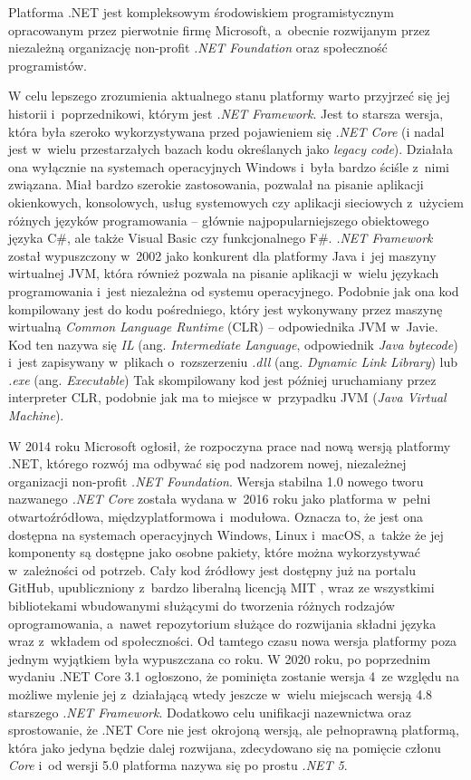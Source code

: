 Platforma .NET jest kompleksowym środowiskiem programistycznym opracowanym przez pierwotnie firmę Microsoft, a~obecnie rozwijanym przez niezależną organizację non-profit \emph{.NET Foundation} oraz społeczność programistów.

W celu lepszego zrozumienia aktualnego stanu platformy warto przyjrzeć się jej historii i~poprzednikowi, którym jest \emph{.NET Framework}.
Jest to starsza wersja, która była szeroko wykorzystywana przed pojawieniem się \emph{.NET Core} (i nadal jest w~wielu przestarzałych bazach kodu określanych jako \emph{legacy code}).
Działała ona wyłącznie na systemach operacyjnych Windows i~była bardzo ściśle z~nimi związana.
Miał bardzo szerokie zastosowania, pozwalał na pisanie aplikacji okienkowych, konsolowych, usług systemowych czy aplikacji sieciowych z~użyciem różnych języków programowania -- głównie najpopularniejszego obiektowego języka C\#, ale także Visual Basic czy funkcjonalnego F\#.
\emph{.NET Framework} został wypuszczony w~2002 jako konkurent dla platformy Java i~jej maszyny wirtualnej JVM, która również pozwala na pisanie aplikacji w~wielu językach programowania i~jest niezależna od systemu operacyjnego.
Podobnie jak ona kod kompilowany jest do kodu pośredniego, który jest wykonywany przez maszynę wirtualną \emph{Common Language Runtime} (CLR) -- odpowiednika JVM w~Javie.
Kod ten nazywa się \emph{IL} (ang. \emph{Intermediate Language}, odpowiednik \emph{Java bytecode}) i~jest zapisywany w~plikach o~rozszerzeniu \emph{.dll} (ang. \emph{Dynamic Link Library}) lub \emph{.exe} (ang. \emph{Executable})
Tak skompilowany kod jest później uruchamiany przez interpreter CLR, podobnie jak ma to miejsce w~przypadku JVM (\emph{Java Virtual Machine}).

W 2014 roku Microsoft ogłosił, że rozpoczyna prace nad nową wersją platformy .NET, którego rozwój ma odbywać się pod nadzorem nowej, niezależnej organizacji non-profit \emph{.NET Foundation}.
Wersja stabilna 1.0 nowego tworu nazwanego \emph{.NET Core} została wydana w~2016 roku jako platforma w~pełni otwartoźródłowa, międzyplatformowa i~modułowa.
Oznacza to, że jest ona dostępna na systemach operacyjnych Windows, Linux i~macOS, a~także że jej komponenty są dostępne jako osobne pakiety, które można wykorzystywać w~zależności od potrzeb.
Cały kod źródłowy jest dostępny już na portalu GitHub, upubliczniony z~bardzo liberalną licencją MIT \cite{dotnet-sdk-repo, dotnet-runtime-repo}, wraz ze wszystkimi bibliotekami wbudowanymi służącymi do tworzenia różnych rodzajów oprogramowania, a~nawet repozytorium służące do rozwijania składni języka wraz z~wkładem od społeczności.
Od tamtego czasu nowa wersja platformy poza jednym wyjątkiem była wypuszczana co roku.
W 2020 roku, po poprzednim wydaniu .NET Core 3.1 ogłoszono, że pominięta zostanie wersja 4~ze względu na możliwe mylenie jej z~działającą wtedy jeszcze w~wielu miejscach wersją 4.8 starszego \emph{.NET Framework}.
Dodatkowo celu unifikacji nazewnictwa oraz sprostowanie, że .NET Core nie jest okrojoną wersją, ale pełnoprawną platformą, która jako jedyna będzie dalej rozwijana, zdecydowano się na pomięcie członu \emph{Core} i~od wersji 5.0 platforma nazywa się po prostu \emph{.NET 5}.

